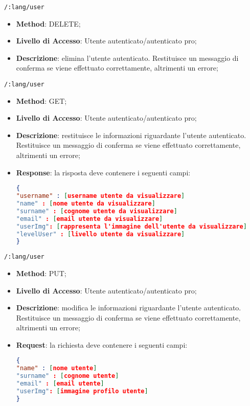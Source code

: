 \item \texttt{/:lang/user}
	\begin{itemize}
		\item \textbf{Method}: DELETE;
		\item \textbf{Livello di Accesso}: Utente autenticato/autenticato pro;
		\item \textbf{Descrizione}: elimina l'utente autenticato. Restituisce un messaggio di conferma se viene effettuato correttamente, altrimenti un errore;
	\end{itemize}	
	
	\item \texttt{/:lang/user}
		\begin{itemize}
			\item \textbf{Method}: GET;
			\item \textbf{Livello di Accesso}: Utente autenticato/autenticato pro;
			\item \textbf{Descrizione}: restituisce le informazioni riguardante l'utente autenticato. Restituisce un messaggio di conferma se viene effettuato correttamente, altrimenti un errore;
			\item \textbf{Response}: la risposta deve contenere i seguenti campi:
\begin{lstlisting}[language=json,firstnumber=1]
{
"username" : [username utente da visualizzare]
"name" : [nome utente da visualizzare]
"surname" : [cognome utente da visualizzare]
"email" : [email utente da visualizzare]
"userImg": [rappresenta l'immagine dell'utente da visualizzare]
"levelUser" : [livello utente da visualizzare]
}
\end{lstlisting}
		\end{itemize}
		
	\item \texttt{/:lang/user}
		\begin{itemize}
			\item \textbf{Method}: PUT;
			\item \textbf{Livello di Accesso}: Utente autenticato/autenticato pro;
			\item \textbf{Descrizione}: modifica le informazioni riguardante l'utente autenticato. Restituisce un messaggio di conferma se viene
effettuato correttamente, altrimenti un errore;
			\item \textbf{Request}: la richiesta deve contenere i seguenti campi:
\begin{lstlisting}[language=json,firstnumber=1]
{
"name" : [nome utente]
"surname" : [cognome utente]
"email" : [email utente]
"userImg": [immagine profilo utente]
}
\end{lstlisting}
		\end{itemize}	
		
